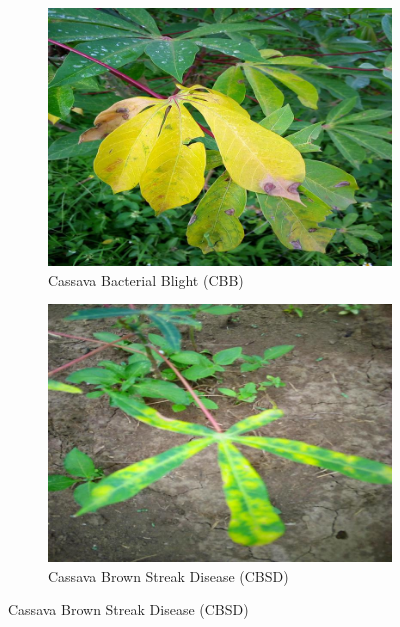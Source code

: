 \documentclass[a4paper,12pt]{article}
\begin{document}
\begin{figure}[H]
    \centering
    \begin{subfigure}{0.45\textwidth}
        \centering
        \includegraphics[width=\textwidth]{./assets/class_images/class_0.jpg}
        \caption{Cassava Bacterial Blight (CBB)}
    \end{subfigure}
    \hfill
    \begin{subfigure}{0.45\textwidth}
        \centering
        \includegraphics[width=\textwidth]{./assets/class_images/class_1.jpg}
        \caption{Cassava Brown Streak Disease (CBSD)}
    \end{subfigure}
    
    \vspace{0.5cm}
    

\end{figure}
\end{document}
